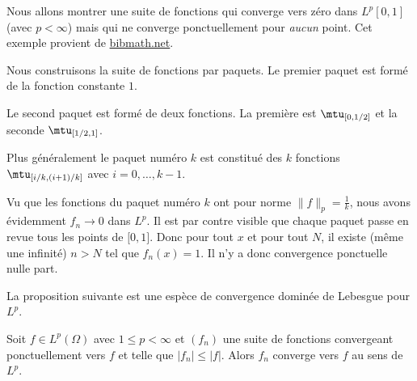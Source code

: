 \begin{example} \label{ExPOmxICc}
    Nous allons montrer une suite de fonctions qui converge vers zéro dans \( L^p[0,1]\) (avec \( p<\infty\)) mais qui ne converge ponctuellement pour \emph{aucun} point. Cet exemple provient de \href{http://www.bibmath.net/dico/index.php?action=affiche&quoi=./b/bosseglissante.html}{bibmath.net}. 


    Nous construisons la suite de fonctions par paquets. Le premier paquet est formé de la fonction constante \( 1\).

    Le second paquet est formé de deux fonctions. La première est \( \mtu_{\mathopen[0 , 1/2 \mathclose]}\) et la seconde \( \mtu_{\mathopen[ 1/2 , 1 \mathclose]}\).

    Plus généralement le paquet numéro \( k\) est constitué des \( k\) fonctions \( \mtu_{\mathopen[ i/k , (i+1)/k \mathclose]}\) avec \( i=0,\ldots, k-1\).

    Vu que les fonctions du paquet numéro \( k\) ont pour norme \( \| f \|_p=\frac{1}{ k }\), nous avons évidemment \( f_n\to 0\) dans \( L^p\). Il est par contre visible que chaque paquet passe en revue tous les points de \( \mathopen[ 0 , 1 \mathclose]\). Donc pour tout \( x\) et pour tout \( N\), il existe (même une infinité) \( n>N\) tel que \( f_n(x)=1\). Il n'y a donc convergence ponctuelle nulle part.
\end{example}

La proposition suivante est une espèce de convergence dominée de Lebesgue pour \( L^p\).
\begin{proposition} \label{PropBVHXycL}
    Soit \( f\in L^p(\Omega)\) avec \( 1\leq p<\infty\) et \( (f_n)\) une suite de fonctions convergeant ponctuellement vers \( f\) et telle que \( | f_n |\leq | f |\). Alors \( f_n\) converge vers \( f\) au sens de \( L^p\).
\end{proposition}

